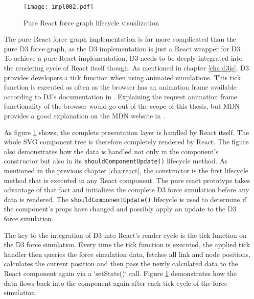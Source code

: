 \begin{figure}
\centering
\texttt{[image: impl002.pdf]}
\caption{Pure React force graph lifecycle visualization}
\label{fig:pureReactLifecycle}
\end{figure}

The pure React force graph implementation is far more complicated than the pure D3 force graph, as the D3 implementation is just a React wrapper for D3. To achieve a pure React implementation, D3 needs to be deeply integrated into the rendering cycle of React itself though. As mentioned in chapter \ref{cha:d3js}, D3 provides developers a tick function when using animated simulations. This tick function is executed as often as the browser has an animation frame available according to D3's documentation in \cite[/d3-timer/blob/master/README.md]{D3Github}. Explaining the request animation frame functionality of the browser would go out of the scope of this thesis, but MDN provides a good explanation on the MDN website in \cite{RAF}.

As figure \ref{fig:pureReactLifecycle} shows, the complete presentation layer is handled by React itself. The whole SVG component tree is therefore completely rendered by React. The figure also demonstrates how the data is handled not only in the component's constructor but also in its \texttt{shouldComponentUpdate()} lifecycle method. As mentioned in the previous chapter \ref{cha:react}, the constructor is the first lifecycle method that is executed in any React component. The pure react prototype takes advantage of that fact and initializes the complete D3 force simulation before any data is rendered. The \texttt{shouldComponentUpdate()} lifecycle is used to determine if the component's props have changed and possibly apply an update to the D3 force simulation.

The key to the integration of D3 into React's render cycle is the tick function on the D3 force simulation. Every time the tick function is executed, the applied tick handler then queries the force simulation data, fetches all link and node positions, calculates the current position and then pass the newly calculated data to the React component again via a `setState()` call. Figure \ref{fig:pureReactLifecycle} demonstrates how the data flows back into the component again after each tick cycle of the force simulation.

